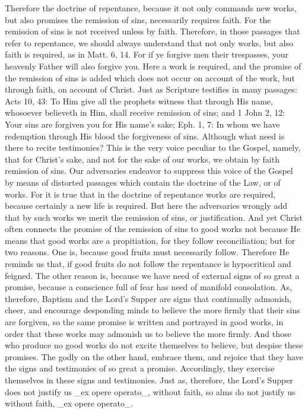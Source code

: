 Therefore the doctrine of repentance, because it not only commands
new works, but also promises the remission of sins, necessarily
requires faith.  For the remission of sins is not received unless by
faith.  Therefore, in those passages that refer to repentance, we
should always understand that not only works, but also faith is
required, as in Matt. 6, 14. For if ye forgive men their trespasses,
your heavenly Father will also forgive you.  Here a work is required,
and the promise of the remission of sins is added which does not
occur on account of the work, but through faith, on account of Christ.
Just as Scripture testifies in many passages: Acts 10, 43: To Him
give all the prophets witness that through His name, whosoever
believeth in Him, shall receive remission of sins; and 1 John 2, 12:
Your sins are forgiven you for His name's sake; Eph. 1, 7: In whom we
have redemption through His blood the forgiveness of sins.  Although
what need is there to recite testimonies?  This is the very voice
peculiar to the Gospel, namely, that for Christ's sake, and not for
the sake of our works, we obtain by faith remission of sins.  Our
adversaries endeavor to suppress this voice of the Gospel by means of
distorted passages which contain the doctrine of the Law, or of works.
For it is true that in the doctrine of repentance works are
required, because certainly a new life is required.  But here the
adversaries wrongly add that by such works we merit the remission of
sins, or justification.  And yet Christ often connects the promise of
the remission of sins to good works not because He means that good
works are a propitiation, for they follow reconciliation; but for two
reasons.  One is, because good fruits must necessarily follow.
Therefore He reminds us that, if good fruits do not follow the
repentance is hypocritical and feigned.  The other reason is, because
we have need of external signs of so great a promise, because a
conscience full of fear has need of manifold consolation.  As,
therefore, Baptism and the Lord's Supper are signs that continually
admonish, cheer, and encourage desponding minds to believe the more
firmly that their sins are forgiven, so the same promise is written
and portrayed in good works, in order that these works may admonish
us to believe the more firmly.  And those who produce no good works
do not excite themselves to believe, but despise these promises.  The
godly on the other hand, embrace them, and rejoice that they have the
signs and testimonies of so great a promise.  Accordingly, they
exercise themselves in these signs and testimonies.  Just as,
therefore, the Lord's Supper does not justify us _ex opere operato_,
without faith, so alms do not justify us without faith, _ex opere
operato_.

